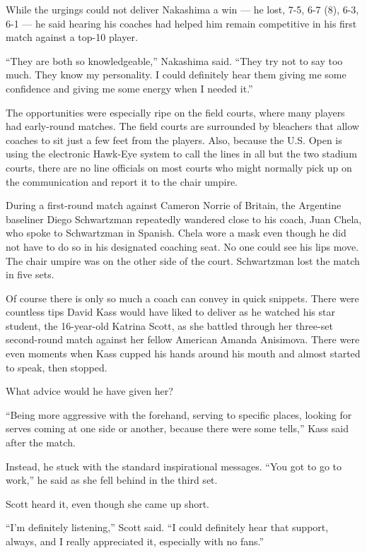 While the urgings could not deliver Nakashima a win --- he lost, 7-5,
6-7 (8), 6-3, 6-1 --- he said hearing his coaches had helped him remain
competitive in his first match against a top-10 player.

``They are both so knowledgeable,'' Nakashima said. ``They try not to
say too much. They know my personality. I could definitely hear them
giving me some confidence and giving me some energy when I needed it.''

The opportunities were especially ripe on the field courts, where many
players had early-round matches. The field courts are surrounded by
bleachers that allow coaches to sit just a few feet from the players.
Also, because the U.S. Open is using the electronic Hawk-Eye system to
call the lines in all but the two stadium courts, there are no line
officials on most courts who might normally pick up on the communication
and report it to the chair umpire.

During a first-round match against Cameron Norrie of Britain, the
Argentine baseliner Diego Schwartzman repeatedly wandered close to his
coach, Juan Chela, who spoke to Schwartzman in Spanish. Chela wore a
mask even though he did not have to do so in his designated coaching
seat. No one could see his lips move. The chair umpire was on the other
side of the court. Schwartzman lost the match in five sets.

Of course there is only so much a coach can convey in quick snippets.
There were countless tips David Kass would have liked to deliver as he
watched his star student, the 16-year-old Katrina Scott, as she battled
through her three-set second-round match against her fellow American
Amanda Anisimova. There were even moments when Kass cupped his hands
around his mouth and almost started to speak, then stopped.

What advice would he have given her?

``Being more aggressive with the forehand, serving to specific places,
looking for serves coming at one side or another, because there were
some tells,'' Kass said after the match.

Instead, he stuck with the standard inspirational messages. ``You got to
go to work,'' he said as she fell behind in the third set.

Scott heard it, even though she came up short.

``I'm definitely listening,'' Scott said. ``I could definitely hear that
support, always, and I really appreciated it, especially with no fans.''

